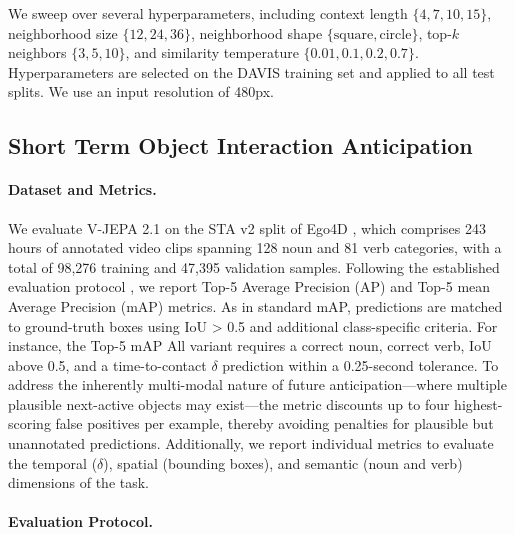 \documentclass[]{fairmeta}
\begin{document}
We sweep over several hyperparameters, including context length $\{4,7,10,15\}$, neighborhood size $\{12,24,36\}$, neighborhood shape $\{\text{square},\text{circle}\}$, top-$k$ neighbors $\{3,5,10\}$, and similarity temperature $\{0.01, 0.1, 0.2, 0.7\}$. 
Hyperparameters are selected on the DAVIS training set and applied to all test splits. We use an input resolution of 480px.


\subsection{Short Term Object Interaction Anticipation}

\paragraph{\bf Dataset and Metrics.}
We evaluate V-JEPA 2.1 on the STA v2 split of Ego4D \citep{grauman2022ego4d}, which comprises 243 hours of annotated video clips spanning 128 noun and 81 verb categories, with a total of 98,276 training and 47,395 validation samples.
Following the established evaluation protocol \citep{grauman2022ego4d}, we report Top-5 Average Precision (AP) and Top-5 mean Average Precision (mAP) metrics. As in standard mAP, predictions are matched to ground-truth boxes using IoU > 0.5 and additional class-specific criteria. For instance, the Top-5 mAP All variant requires a correct noun, correct verb, IoU above 0.5, and a time-to-contact $\delta$ prediction within a 0.25-second tolerance. To address the inherently multi-modal nature of future anticipation—where multiple plausible next-active objects may exist—the metric discounts up to four highest-scoring false positives per example, thereby avoiding penalties for plausible but unannotated predictions.
Additionally, we report individual metrics to evaluate the temporal ($\delta$), spatial (bounding boxes), and semantic (noun and verb) dimensions of the task.

\paragraph{\bf Evaluation Protocol.}
\end{document}
